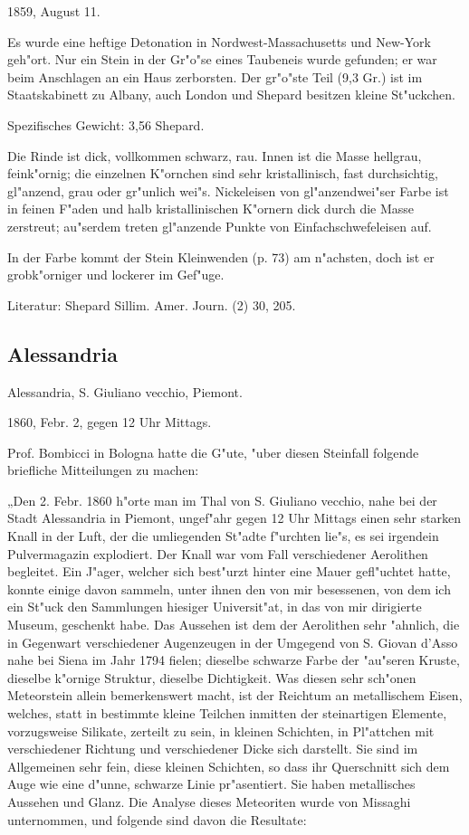 \documentclass[a4paper, 11pt, oneside]{article}
\begin{document}
1859, August 11.

Es wurde eine heftige Detonation in Nordwest-Massachusetts und New-York geh"ort. Nur ein Stein in der Gr"o"se eines Taubeneis wurde gefunden; er war beim Anschlagen an ein Haus zerborsten. Der gr"o"ste Teil (9,3 Gr.) ist im Staatskabinett zu Albany, auch London und Shepard besitzen kleine St"uckchen.

Spezifisches Gewicht: 3,56 Shepard.

Die Rinde ist dick, vollkommen schwarz, rau. Innen ist die Masse hellgrau, feink"ornig; die einzelnen K"ornchen sind sehr kristallinisch, fast durchsichtig, gl"anzend, grau oder gr"unlich wei"s. Nickeleisen von gl"anzendwei"ser Farbe ist in feinen F"aden und halb kristallinischen K"ornern dick durch die Masse zerstreut; au"serdem treten gl"anzende Punkte von Einfachschwefeleisen auf.

In der Farbe kommt der Stein Kleinwenden (p. 73) am n"achsten, doch ist er grobk"orniger und lockerer im Gef"uge.

Literatur: Shepard Sillim. Amer. Journ. (2) 30, 205.

\subsection{Alessandria}

Alessandria, S. Giuliano vecchio, Piemont.

1860, Febr. 2, gegen 12 Uhr Mittags.

Prof. Bombicci in Bologna hatte die G"ute, "uber diesen Steinfall folgende briefliche Mitteilungen zu machen:

„Den 2. Febr. 1860 h"orte man im Thal von S. Giuliano vecchio, nahe bei der Stadt Alessandria in Piemont, ungef"ahr gegen 12 Uhr Mittags einen sehr starken Knall in der Luft, der die umliegenden St"adte f"urchten lie"s, es sei irgendein Pulvermagazin explodiert. Der Knall war vom Fall verschiedener Aerolithen begleitet. Ein J"ager, welcher sich best"urzt hinter eine Mauer gefl"uchtet hatte, konnte einige davon sammeln, unter ihnen den von mir besessenen, von dem ich ein St"uck den Sammlungen hiesiger Universit"at, in das von mir dirigierte Museum, geschenkt habe. Das Aussehen ist dem der Aerolithen sehr "ahnlich, die in Gegenwart verschiedener Augenzeugen in der Umgegend von S. Giovan d'Asso nahe bei Siena im Jahr 1794 fielen; dieselbe schwarze Farbe der "au"seren Kruste, dieselbe k"ornige Struktur, dieselbe Dichtigkeit. Was diesen sehr sch"onen Meteorstein allein bemerkenswert macht, ist der Reichtum an metallischem Eisen, welches, statt in bestimmte kleine Teilchen inmitten der steinartigen Elemente, vorzugsweise Silikate, zerteilt zu sein, in kleinen Schichten, in Pl"attchen mit verschiedener Richtung und verschiedener Dicke sich darstellt. Sie sind im Allgemeinen sehr fein, diese kleinen Schichten, so dass ihr Querschnitt sich dem Auge wie eine d"unne, schwarze Linie pr"asentiert. Sie haben metallisches Aussehen und Glanz. Die Analyse dieses Meteoriten wurde von Missaghi unternommen, und folgende sind davon die Resultate:
\end{document}
